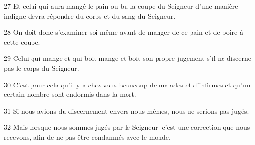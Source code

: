 
27 Et celui qui aura mangé le pain ou bu la coupe du Seigneur d’une manière indigne devra répondre du corps et du sang du Seigneur.

28 On doit donc s’examiner soi-même avant de manger de ce pain et de boire à cette coupe.

29 Celui qui mange et qui boit mange et boit son propre jugement s’il ne discerne pas le corps du Seigneur.

30 C’est pour cela qu’il y a chez vous beaucoup de malades et d’infirmes et qu’un certain nombre sont endormis dans la mort.

31 Si nous avions du discernement envers nous-mêmes, nous ne serions pas jugés.

32 Mais lorsque nous sommes jugés par le Seigneur, c’est une correction que nous recevons, afin de ne pas être condamnés avec le monde.